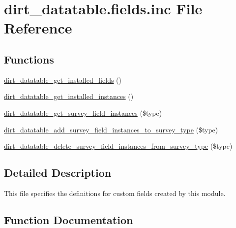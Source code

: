\hypertarget{dirt__datatable_8fields_8inc}{}\section{dirt\+\_\+datatable.\+fields.\+inc File Reference}
\label{dirt__datatable_8fields_8inc}
\subsection*{Functions}
\begin{DoxyCompactItemize}
\item 
\mbox{\hyperlink{dirt__datatable_8fields_8inc_ab4e69d657facefaa1e0e288fdd239284}{dirt\+\_\+datatable\+\_\+get\+\_\+installed\+\_\+fields}} ()
\item 
\mbox{\hyperlink{dirt__datatable_8fields_8inc_aa9d156556f5a524180520747aa82bb2d}{dirt\+\_\+datatable\+\_\+get\+\_\+installed\+\_\+instances}} ()
\item 
\mbox{\hyperlink{dirt__datatable_8fields_8inc_a4aea89290b5bbd5923062a6b44592c28}{dirt\+\_\+datatable\+\_\+get\+\_\+survey\+\_\+field\+\_\+instances}} (\$type)
\item 
\mbox{\hyperlink{dirt__datatable_8fields_8inc_a95914aa0f997c05ef2177a9bfc2ca849}{dirt\+\_\+datatable\+\_\+add\+\_\+survey\+\_\+field\+\_\+instances\+\_\+to\+\_\+survey\+\_\+type}} (\$type)
\item 
\mbox{\hyperlink{dirt__datatable_8fields_8inc_a33da349690275ee8b21716e0ff1ea08c}{dirt\+\_\+datatable\+\_\+delete\+\_\+survey\+\_\+field\+\_\+instances\+\_\+from\+\_\+survey\+\_\+type}} (\$type)
\end{DoxyCompactItemize}


\subsection{Detailed Description}
This file specifies the definitions for custom fields created by this module. 

\subsection{Function Documentation}
\mbox{\label{dirt__datatable_8fields_8inc_a95914aa0f997c05ef2177a9bfc2ca849}} 
